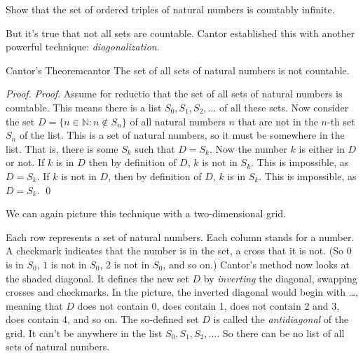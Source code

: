 
\begin{exercise}
  Show that the set of ordered triples of natural numbers is countably infinite.
\end{exercise}


But it's true that not all sets are countable.
Cantor established this with another powerful technique:
\emph{diagonalization}.

\begin{theorem}{Cantor's Theorem}{cantor}
  The set of all sets of natural numbers is not countable.
\end{theorem}

\begin{proof}
  \emph{Proof}.
  Assume for reductio that the set of all sets of natural numbers is countable.
  This means there is a list $S_0, S_1, S_2, \ldots$ of all these sets.
  Now consider the set $D = \{ n \in \mathbb{N} : n \notin S_n \}$
  of all natural numbers $n$ that are not in the $n$-th set $S_n$ of the list.
  This is a set of natural numbers,
  so it must be somewhere in the list.
  That is,
  there is some $S_k$ such that $D = S_k$.
  Now the number $k$ is either in $D$ or not.
  If $k$ is in $D$
  then by definition of $D$,
  $k$ is not in $S_k$.
  This is impossible, as $D = S_k$.
  If $k$ is not in $D$,
  then by definition of $D$,
  $k$ is in $S_k$.
  This is impossible, as $D = S_k$.
  \qed
\end{proof}

We can again picture this technique with a two-dimensional grid.

\begin{center}
  
\end{center}

Each row represents a set of natural numbers.
Each column stands for a number.
A checkmark indicates that the number is in the set,
a cross that it is not.
(So $0$ is in $S_0$, $1$ is not in $S_0$, 2 is not in $S_{0}$, and so on.)
Cantor's method now looks at the shaded diagonal.
It defines the new set $D$ by \emph{inverting} the diagonal,
swapping crosses and checkmarks.
In the picture,
the inverted diagonal would begin with \xmarkd \cmarkd \xmarkd \xmarkd \cmarkd \ldots,
meaning that $D$ does not contain $0$,
does contain 1,
does not contain 2 and 3,
does contain 4,
and so on.
The so-defined set $D$ is called the \emph{antidiagonal} of the grid.
It can't be anywhere in the list $S_0, S_1, S_2, \ldots$.
So there can be no list of all sets of natural numbers.

